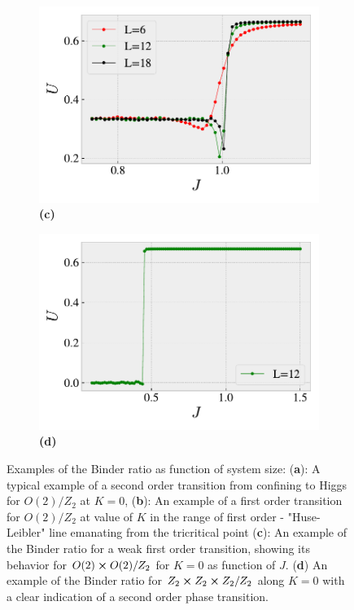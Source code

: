 \begin{figure}[!h]
\begin{subfigure}{0.45\textwidth}
		\includegraphics[width=\columnwidth]{figures/chapter2/BinderK0O2xO2Z2.pdf}
		\caption{\textbf{(c)}}
	\end{subfigure}%
	\begin{subfigure}{0.45\textwidth}
		\centering
		\includegraphics[width=\columnwidth]{figures/chapter2/BinderK0Z2xZ2xZ2Z2.pdf}
		\caption{\textbf{(d)}}
	\end{subfigure}
	\caption{Examples of the Binder ratio as function of system size: (\textbf{a}):  A typical example of a second order transition from confining to Higgs for $O(2)/Z_2$ at $K=0$, (\textbf{b}): An example of a first order transition for $O(2)/Z_2$ at value of $K$ in the range of first order - "Huse-Leibler" line emanating from the tricritical point (\textbf{c}):  An example of the Binder ratio for a weak first order transition, showing its behavior for $O(2) \cross O(2) / Z_2$ for  $K=0$ as function of $J$. (\textbf{d}) An example of the Binder ratio for $Z_2 \cross Z_2 \cross Z_2 / Z_2$ along $K=0$ with a clear indication of a second order phase transition.}
	\label{weakfirstorder}	
\end{figure}


